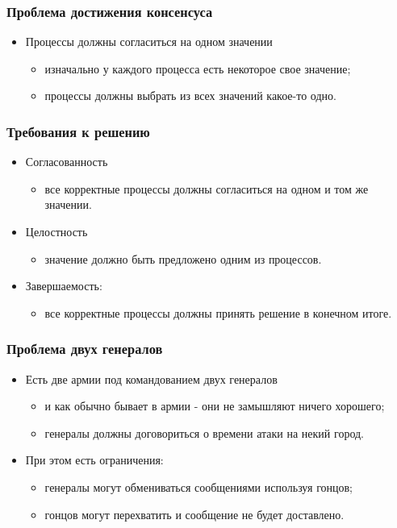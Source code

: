 \begin{frame}
\frametitle{Проблема достижения консенсуса}
\begin{itemize}
  \item Процессы должны согласиться на одном значении
  \begin{itemize}
    \item изначально у каждого процесса есть некоторое свое значение;
    \item процессы должны выбрать из всех значений какое-то одно.
  \end{itemize}
\end{itemize}
\end{frame}

\begin{frame}
\frametitle{Требования к решению}
\begin{itemize}
  \item Согласованность
  \begin{itemize}
    \item все корректные процессы должны согласиться на одном и том же значении.
  \end{itemize}
  \item Целостность
  \begin{itemize}
    \item значение должно быть предложено одним из процессов.
  \end{itemize}
  \item Завершаемость:
  \begin{itemize}
    \item все корректные процессы должны принять решение в конечном итоге.
  \end{itemize}
\end{itemize}
\end{frame}

\begin{frame}
\frametitle{Проблема двух генералов}
\begin{itemize}
  \item Есть две армии под командованием двух генералов
  \begin{itemize}
    \item и как обычно бывает в армии - они не замышляют ничего хорошего;
    \item генералы должны договориться о времени атаки на некий город.
  \end{itemize}
  \item При этом есть ограничения:
  \begin{itemize}
    \item генералы могут обмениваться сообщениями используя гонцов;
    \item гонцов могут перехватить и сообщение не будет доставлено.
  \end{itemize}
\end{itemize}
\end{frame}

